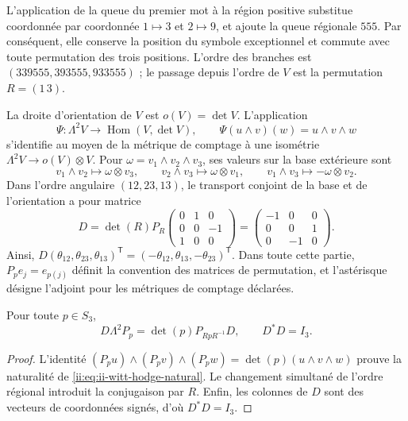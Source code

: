 L’application de la queue du premier mot à la région positive
substitue coordonnée par coordonnée \(1\mapsto3\) et \(2\mapsto9\), et ajoute
la queue régionale \(555\). Par conséquent, elle conserve la position du symbole
exceptionnel et commute avec toute permutation des trois positions. L’ordre
des branches est \((339555,393555,933555)\) ; le passage depuis l’ordre de
\(V\) est la permutation \(R=(1\,3)\).

La droite d’orientation de \(V\) est \(o(V)=\det V\). L’application
\begin{equation}
 \Psi:\Lambda^2V\longrightarrow\operatorname{Hom}(V,\det V),
 \qquad \Psi(u\wedge v)(w)=u\wedge v\wedge w
 \label{ii:eq:ii-witt-hodge-natural}
\end{equation}
s’identifie au moyen de la métrique de comptage à une isométrie
\(\Lambda^2V\to o(V)\otimes V\). Pour
\(\omega=v_1\wedge v_2\wedge v_3\), ses valeurs sur la base extérieure
sont
\[
 v_1\wedge v_2\mapsto\omega\otimes v_3,
 \qquad v_2\wedge v_3\mapsto\omega\otimes v_1,
 \qquad v_1\wedge v_3\mapsto-\omega\otimes v_2.
\]
Dans l’ordre angulaire \((12,23,13)\), le transport conjoint de la base et de
l’orientation a pour matrice
\begin{equation}
 D=\det(R)P_R
 \begin{pmatrix}0&1&0\\0&0&-1\\1&0&0\end{pmatrix}
 =\begin{pmatrix}-1&0&0\\0&0&1\\0&-1&0\end{pmatrix}.
 \label{ii:eq:ii-witt-orientation-D}
\end{equation}
Ainsi,
\(D(\theta_{12},\theta_{23},\theta_{13})^{\mathsf T}
=(-\theta_{12},\theta_{13},-\theta_{23})^{\mathsf T}\).
Dans toute cette partie, \(P_p e_j=e_{p(j)}\) définit la convention des
matrices de permutation, et l’astérisque désigne l’adjoint pour les métriques
de comptage déclarées.

\begin{proposition}
\label{ii:prop:ii-witt-D-natural}
Pour toute \(p\in S_3\),
\[
 D\Lambda^2P_p=\det(p)P_{RpR^{-1}}D,
 \qquad D^*D=I_3.
\]
\end{proposition}
\begin{proof}
L’identité
\((P_pu)\wedge(P_pv)\wedge(P_pw)=\det(p)(u\wedge v\wedge w)\)
prouve la naturalité de \eqref{ii:eq:ii-witt-hodge-natural}. Le changement
simultané de l’ordre régional introduit la conjugaison par \(R\).
Enfin, les colonnes de \(D\) sont des vecteurs de coordonnées signés,
d’où \(D^*D=I_3\).
\end{proof}

